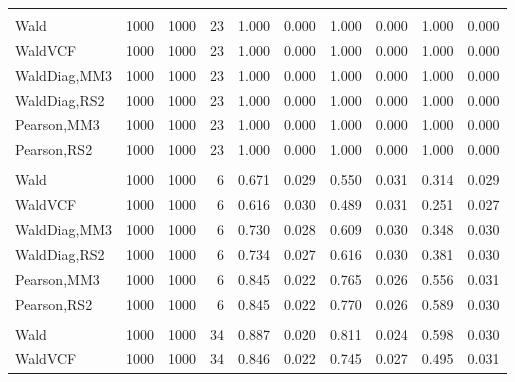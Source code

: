 \documentclass[
]{article}
\begin{document}
\begin{table}[H]
{\begin{tabular}[t]{lrrrrrrlrr}
\addlinespace[0.3em]
\multicolumn{10}{l}{\textbf{1F 15V}}\\
\hspace{1em}Wald & 1000 & 1000 & 23 & 1.000 & 0.000 & 1.000 & 0.000 & 1.000 & 0.000\\
\hspace{1em}WaldVCF & 1000 & 1000 & 23 & 1.000 & 0.000 & 1.000 & 0.000 & 1.000 & 0.000\\
\hspace{1em}WaldDiag,MM3 & 1000 & 1000 & 23 & 1.000 & 0.000 & 1.000 & 0.000 & 1.000 & 0.000\\
\hspace{1em}WaldDiag,RS2 & 1000 & 1000 & 23 & 1.000 & 0.000 & 1.000 & 0.000 & 1.000 & 0.000\\
\hspace{1em}Pearson,MM3 & 1000 & 1000 & 23 & 1.000 & 0.000 & 1.000 & 0.000 & 1.000 & 0.000\\
\hspace{1em}Pearson,RS2 & 1000 & 1000 & 23 & 1.000 & 0.000 & 1.000 & 0.000 & 1.000 & 0.000\\
\addlinespace[0.3em]
\multicolumn{10}{l}{\textbf{2F 10V}}\\
\hspace{1em}Wald & 1000 & 1000 & 6 & 0.671 & 0.029 & 0.550 & 0.031 & 0.314 & 0.029\\
\hspace{1em}WaldVCF & 1000 & 1000 & 6 & 0.616 & 0.030 & 0.489 & 0.031 & 0.251 & 0.027\\
\hspace{1em}WaldDiag,MM3 & 1000 & 1000 & 6 & 0.730 & 0.028 & 0.609 & 0.030 & 0.348 & 0.030\\
\hspace{1em}WaldDiag,RS2 & 1000 & 1000 & 6 & 0.734 & 0.027 & 0.616 & 0.030 & 0.381 & 0.030\\
\hspace{1em}Pearson,MM3 & 1000 & 1000 & 6 & 0.845 & 0.022 & 0.765 & 0.026 & 0.556 & 0.031\\
\hspace{1em}Pearson,RS2 & 1000 & 1000 & 6 & 0.845 & 0.022 & 0.770 & 0.026 & 0.589 & 0.030\\
\addlinespace[0.3em]
\multicolumn{10}{l}{\textbf{3F 15V}}\\
\hspace{1em}Wald & 1000 & 1000 & 34 & 0.887 & 0.020 & 0.811 & 0.024 & 0.598 & 0.030\\
\hspace{1em}WaldVCF & 1000 & 1000 & 34 & 0.846 & 0.022 & 0.745 & 0.027 & 0.495 & 0.031\\

\end{tabular}}
\end{table}
\end{document}
